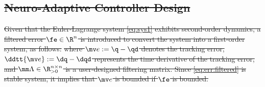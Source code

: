 \documentclass[letterpaper, journal]{IEEEtran}
\providecommand{\DIFdel}[1]{{\protect\color{red}\sout{#1}}} %
\providecommand{\DIFdelbegin}{} %
\providecommand{\DIFdelend}{} %
\begin{document}
\DIFdelbegin \subsection{\DIFdel{Neuro-Adaptive Controller Design}}%
\addtocounter{subsection}{-1}%
\DIFdelend %

\DIFdelbegin \DIFdel{Given that the Euler-Lagrange system \eqref{eq:sys1} exhibits second-order dynamics, a filtered error $\fe\in\R^n$ is introduced to convert the system into a first-order system, as follows:
}%
\DIFdel{where $\mv e := \q - \qd$ denotes the tracking error, $\ddtt{\mv e} := \dq - \dqd$ represents the time derivative of the tracking error, and $\mm\Lambda\in\R^{n\times n}_{>0}$ is a user-designed filtering matrix.
Since \eqref{eq:err:filtered} is stable system, it implies that $\mv e$ is bounded if $\fe$ is bounded.
}\DIFdelend %
\end{document}

